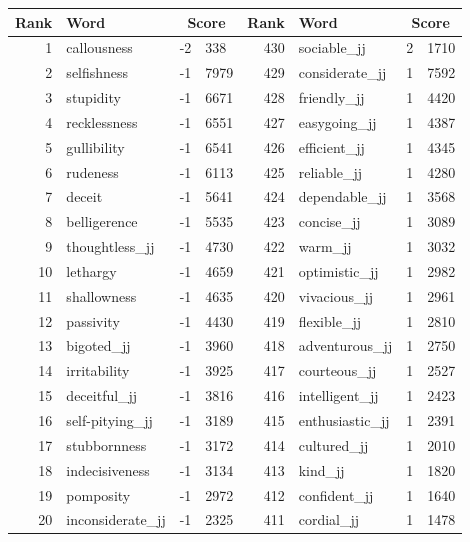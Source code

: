 \begin{table}[tbp]
    \begin{tabular}{| rlr@{.}l | rlr@{.}l |}
    \hline
    \textbf{Rank} & \textbf{Word} & \multicolumn{2}{c|}{\textbf{Score}} & \textbf{Rank} & \textbf{Word} & \multicolumn{2}{c|}{\textbf{Score}} \\
    \hline
    1 & callousness & -2 & 338    &    430 & sociable\_jj & 2 & 1710 \\
    2 & selfishness & -1 & 7979    &    429 & considerate\_jj & 1 & 7592 \\
    3 & stupidity & -1 & 6671    &    428 & friendly\_jj & 1 & 4420 \\
    4 & recklessness & -1 & 6551    &    427 & easygoing\_jj & 1 & 4387 \\
    5 & gullibility & -1 & 6541    &    426 & efficient\_jj & 1 & 4345 \\
    6 & rudeness & -1 & 6113    &    425 & reliable\_jj & 1 & 4280 \\
    7 & deceit & -1 & 5641    &    424 & dependable\_jj & 1 & 3568 \\
    8 & belligerence & -1 & 5535    &    423 & concise\_jj & 1 & 3089 \\
    9 & thoughtless\_jj & -1 & 4730    &    422 & warm\_jj & 1 & 3032 \\
    10 & lethargy & -1 & 4659    &    421 & optimistic\_jj & 1 & 2982 \\
    11 & shallowness & -1 & 4635    &    420 & vivacious\_jj & 1 & 2961 \\
    12 & passivity & -1 & 4430    &    419 & flexible\_jj & 1 & 2810 \\
    13 & bigoted\_jj & -1 & 3960    &    418 & adventurous\_jj & 1 & 2750 \\
    14 & irritability & -1 & 3925    &    417 & courteous\_jj & 1 & 2527 \\
    15 & deceitful\_jj & -1 & 3816    &    416 & intelligent\_jj & 1 & 2423 \\
    16 & self-pitying\_jj & -1 & 3189    &    415 & enthusiastic\_jj & 1 & 2391 \\
    17 & stubbornness & -1 & 3172    &    414 & cultured\_jj & 1 & 2010 \\
    18 & indecisiveness & -1 & 3134    &    413 & kind\_jj & 1 & 1820 \\
    19 & pomposity & -1 & 2972    &    412 & confident\_jj & 1 & 1640 \\
    20 & inconsiderate\_jj & -1 & 2325    &    411 & cordial\_jj & 1 & 1478 \\

\end{tabular}
\end{table}
